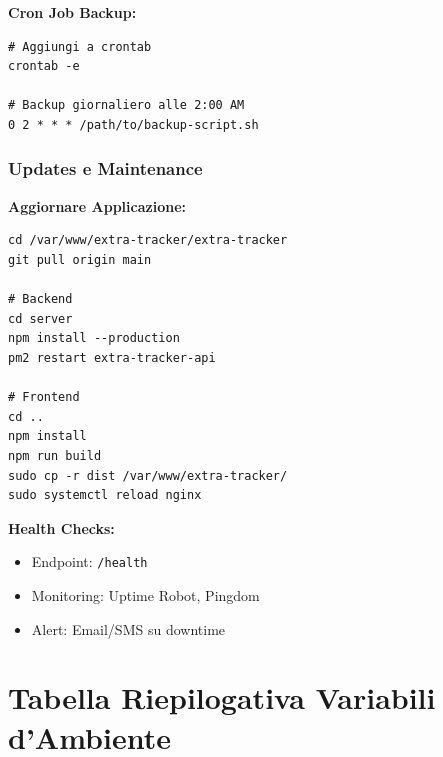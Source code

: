 \documentclass[11pt,a4paper]{article}
\newcommand{\code}[1]{\texttt{#1}}
\begin{document}
\textbf{Cron Job Backup:}
\begin{lstlisting}
# Aggiungi a crontab
crontab -e

# Backup giornaliero alle 2:00 AM
0 2 * * * /path/to/backup-script.sh
\end{lstlisting}

\subsubsection{Updates e Maintenance}

\textbf{Aggiornare Applicazione:}
\begin{lstlisting}
cd /var/www/extra-tracker/extra-tracker
git pull origin main

# Backend
cd server
npm install --production
pm2 restart extra-tracker-api

# Frontend
cd ..
npm install
npm run build
sudo cp -r dist /var/www/extra-tracker/
sudo systemctl reload nginx
\end{lstlisting}

\textbf{Health Checks:}
\begin{itemize}
    \item Endpoint: \code{/health}
    \item Monitoring: Uptime Robot, Pingdom
    \item Alert: Email/SMS su downtime
\end{itemize}

\section{Tabella Riepilogativa Variabili d'Ambiente}
\end{document}
